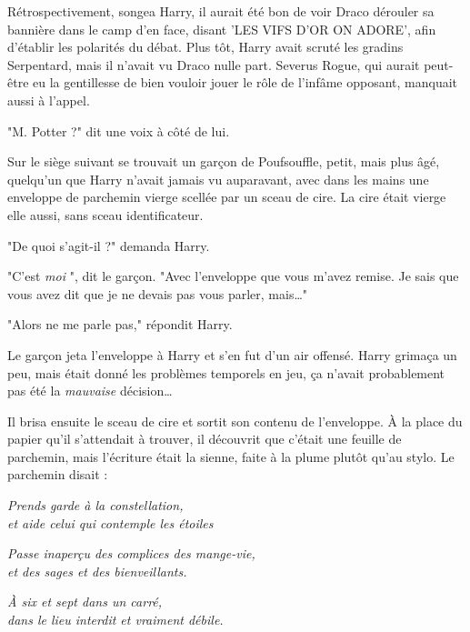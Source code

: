 Rétrospectivement, songea Harry, il aurait été bon de voir Draco dérouler sa bannière dans le camp d'en face, disant 'LES VIFS D'OR ON ADORE', afin d'établir les polarités du débat. Plus tôt, Harry avait scruté les gradins Serpentard, mais il n'avait vu Draco nulle part. Severus Rogue, qui aurait peut-être eu la gentillesse de bien vouloir jouer le rôle de l'infâme opposant, manquait aussi à l'appel.

"M. Potter ?" dit une voix à côté de lui.

Sur le siège suivant se trouvait un garçon de Poufsouffle, petit, mais plus âgé, quelqu'un que Harry n'avait jamais vu auparavant, avec dans les mains une enveloppe de parchemin vierge scellée par un sceau de cire. La cire était vierge elle aussi, sans sceau identificateur.

"De quoi s'agit-il ?" demanda Harry.

"C'est \emph{moi} ", dit le garçon. "Avec l'enveloppe que vous m'avez remise. Je sais que vous avez dit que je ne devais pas vous parler, mais…"

"Alors ne me parle pas," répondit Harry.

Le garçon jeta l'enveloppe à Harry et s'en fut d'un air offensé. Harry grimaça un peu, mais était donné les problèmes temporels en jeu, ça n'avait probablement pas été la \emph{mauvaise}  décision…

Il brisa ensuite le sceau de cire et sortit son contenu de l'enveloppe. À la place du papier qu'il s'attendait à trouver, il découvrit que c'était une feuille de parchemin, mais l'écriture était la sienne, faite à la plume plutôt qu'au stylo. Le parchemin disait :


\begin{center}\emph{Prends garde à la constellation,} \\\emph{et aide celui qui contemple les étoiles } \end{center}



\begin{center}\emph{Passe inaperçu des complices des mange-vie,} \\\emph{et des sages et des bienveillants. } \end{center}



\begin{center}\emph{À six et sept dans un carré,} \\\emph{dans le lieu interdit et vraiment débile. } \end{center}


